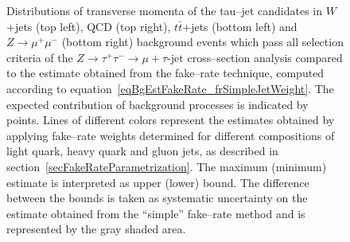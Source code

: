 \begin{figure}[t]
\begin{center}
\begin{picture}
\end{picture}
\caption{\captiontext Distributions of transverse momenta of the tau--jet candidates in
         $W$+jets (top left), QCD (top right), $t\bar{t}$+jets (bottom left) 
         and $Z \rightarrow \mu^{+} \mu^{-}$ (bottom right) background events which pass all selection criteria 
         of the $Z \rightarrow \tau^{+} \tau^{-} \rightarrow \mu + \tau\mbox{-jet}$ cross--section analysis
	 compared to the estimate obtained from the fake--rate technique, 
         computed according to equation~\ref{eqBgEstFakeRate_frSimpleJetWeight}.
	 The expected contribution of background processes is indicated by points.
	 Lines of different colors represent the estimates obtained by applying 
         fake--rate weights determined for different compositions of light quark, heavy quark and gluon jets,
         as described in section~\ref{secFakeRateParametrization}.
	 The maximum (minimum) estimate is interpreted as upper (lower) bound.
	 The difference between the bounds is taken as systematic uncertainty on the estimate 
         obtained from the ``simple'' fake--rate method and is represented by the gray shaded area.}
\label{figBgEstFakeRate_frSimpleResults_tauJetPt}
\end{center}
\end{figure} 

